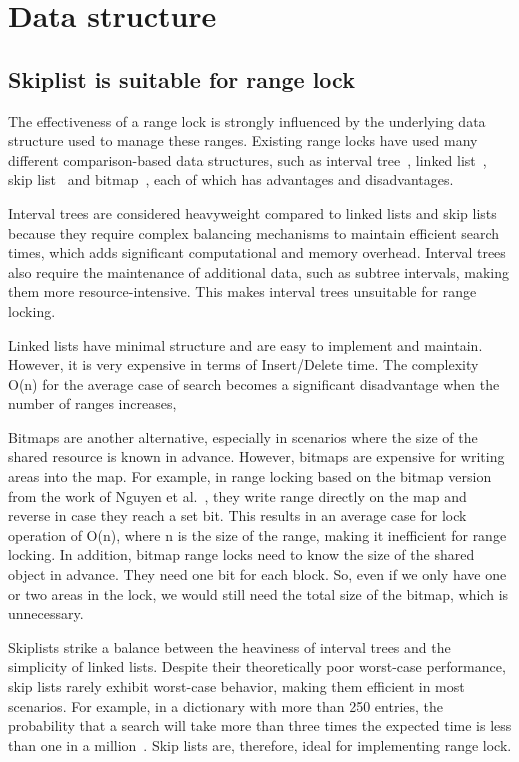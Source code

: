 \chapter{Data structure}\label{ch:data-structure}

\section{Skiplist is suitable for range lock}
The effectiveness of a range lock is strongly influenced by the underlying data structure used to manage these ranges. 
Existing range locks have used many different comparison-based data structures, such as interval tree~\parencite{linuxRangeLockImpl2013, kim2019pnova}, linked list~\parencite{song2013parallelizing}, skip list~\parencite{kogan2020scalable} and bitmap~\parencite{kim2019pnova, nguyen2024files}, each of which has advantages and disadvantages. 

Interval trees are considered heavyweight compared to linked lists and skip lists because they require complex balancing mechanisms to maintain efficient search times, which adds significant computational and memory overhead. 
Interval trees also require the maintenance of additional data, such as subtree intervals, making them more resource-intensive. This makes interval trees unsuitable for range locking. 

Linked lists have minimal structure and are easy to implement and maintain. However, it is very expensive in terms of Insert/Delete time. The complexity O(n) for the average case of search becomes a significant disadvantage when the number of ranges increases, 

Bitmaps are another alternative, especially in scenarios where the size of the shared resource is known in advance. However, bitmaps are expensive for writing areas into the map. 
For example, in range locking based on the bitmap version from the work of Nguyen et al.~\parencite{nguyen2024files}, they write range directly on the map and reverse in case they reach a set bit. 
This results in an average case for lock operation of O(n), where n is the size of the range, making it inefficient for range locking. 
In addition, bitmap range locks need to know the size of the shared object in advance. They need one bit for each block. 
So, even if we only have one or two areas in the lock, we would still need the total size of the bitmap, which is unnecessary.  

Skiplists strike a balance between the heaviness of interval trees and the simplicity of linked lists. Despite their theoretically poor worst-case performance, skip lists rarely exhibit worst-case behavior, making them efficient in most scenarios.
For example, in a dictionary with more than 250 entries, the probability that a search will take more than three times the expected time is less than one in a million~\parencite{pugh1990skip2}. 
Skip lists are, therefore, ideal for implementing range lock.


